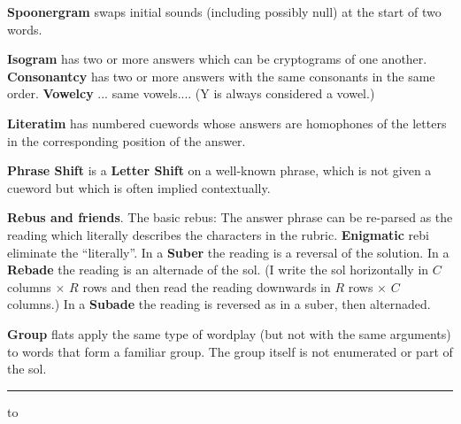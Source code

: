 {\bf Spoonergram} swaps initial sounds (including possibly null) at
the start of two words.

{\bf Isogram} has two or more answers which can be cryptograms of one
another. {\bf Consonantcy} has two or more answers with the same
consonants in the same order. {\bf Vowelcy} ... same vowels.... (Y is
always considered a vowel.)

{\bf Literatim} has numbered cuewords whose answers are homophones of
the letters in the corresponding position of the answer.

{\bf Phrase Shift} is a {\bf Letter Shift} on a well-known phrase,
which is not given a cueword but which is often implied contextually.

{\bf Rebus and friends}. The basic rebus: The answer phrase can be
re-parsed as the reading which literally describes the characters in
the rubric. {\bf Enigmatic} rebi eliminate the ``literally''. In a
{\bf Suber} the reading is a reversal of the solution. In a {\bf
Rebade} the reading is an alternade of the sol. (I write the sol
horizontally in $C$ columns $\times$ $R$ rows and then read the
reading downwards in $R$ rows $\times$ $C$ columns.) In a {\bf Subade}
the reading is reversed as in a suber, then alternaded.

{\bf Group} flats apply the same type of wordplay (but not with the
same arguments) to words that form a familiar group. The group itself
is not enumerated or part of the sol.

\vskip 6pt
\hrule 
\vskip 4pt

\hbox to 
\bye
